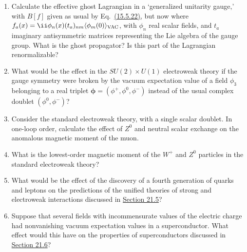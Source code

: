 

\begin{enumerate}
\item Calculate the effective ghost Lagrangian in a `generalized unitarity
gauge,' with $B[f]$ given as usual by
Eq.~\hyperref[eq:15.5.22]{(15.5.22)}, but now where
$f_a(x)=\ii\phi_n(x)(t_a)_{nm}
\langle\phi_m(0)\rangle_{\rm VAC}$, with $\phi_n$ real scalar fields, and
$t_a$ imaginary antisymmetric matrices representing the Lie algebra of
the gauge group. What is the ghost propagator? Is this part of the
Lagrangian renormalizable?

\item What would be the effect in the $SU(2)\times U(1)$ electroweak theory if
the gauge symmetry were broken by the vacuum expectation value of a field
$\phi_3$ belonging to a real triplet
$\boldsymbol{\phi}=(\phi^+,\phi^0,\phi^-)$ instead of the usual complex doublet
$(\phi^0,\phi^-)$?

\item Consider the standard electroweak theory, with a single scalar doublet.
In one-loop order, calculate the effect of $Z^0$ and neutral scalar exchange
on the anomalous magnetic moment of the muon.

\item What is the lowest-order magnetic moment of the $W^+$ and $Z^0$
particles in the standard electroweak theory?

\item What would be the effect of the discovery of a fourth generation of
quarks and leptons on the predictions of the unified theories of strong and
electroweak interactions discussed in
\hyperref[sec:21.5]{Section 21.5}?

\item Suppose that several fields with incommensurate values of the electric
charge had nonvanishing vacuum expectation values in a superconductor. What
effect would this have on the properties of superconductors discussed in
\hyperref[sec:21.6]{Section 21.6}?
\end{enumerate}

